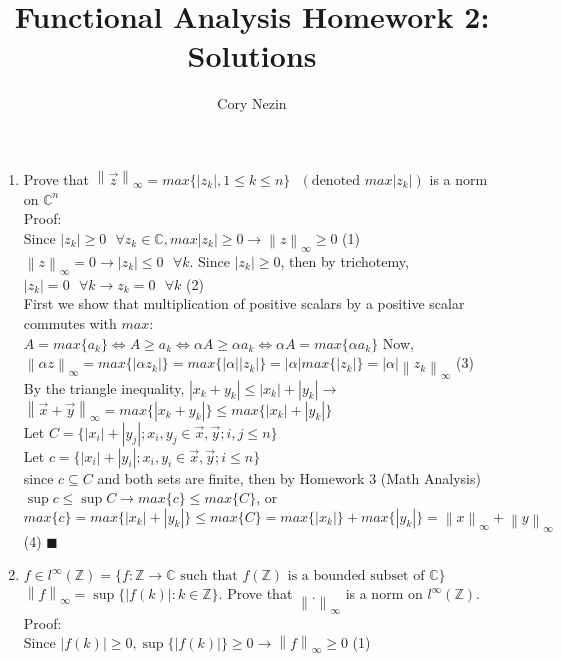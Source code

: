 \documentclass[12pt]{article}
\title{Functional Analysis Homework 2: Solutions}
\author{Cory Nezin}
\newcommand{\norm}[1]{\left \lVert#1\right\rVert_\infty}
\begin{document}
\maketitle
\begin{enumerate}
\item Prove that $\norm{\vec{z}} = max\{|z_k|, 1\leq k\leq n\} \text{ }(\text{denoted } max{|z_k|})$ is a norm on $\mathbb{C}^n$\\
Proof:\\
Since $|z_k| \geq 0 \text{ } \forall z_k \in \mathbb{C}, max{|z_k|} \geq 0 \rightarrow \norm{z} \geq 0$ (1)\\
$\norm{z} = 0 \rightarrow |z_k| \leq 0 \text{ }\forall k$.  Since $|z_k| \geq 0$, then by trichotemy, $|z_k| = 0 \text{ } \forall k \rightarrow z_k = 0 \text{ }\forall k$ (2)\\
First we show that multiplication of positive scalars by a positive scalar commutes with $max$:\\
$A = max\{a_k\} \Leftrightarrow A \geq a_k \Leftrightarrow \alpha A \geq \alpha a_k \Leftrightarrow \alpha A = max\{\alpha a_k\}$ Now,\\
$\norm{\alpha z} = max\{|\alpha z_k|\} = max\{|\alpha| |z_k|\} = |\alpha|max\{|z_k|\} = |\alpha|\norm{z_k}$ (3)\\
By the triangle inequality, $|x_k+y_k| \leq |x_k| + |y_k|\rightarrow$\\
$\norm{\vec{x}+\vec{y}} = max\{|x_k+y_k|\} \leq max\{|x_k|+|y_k|\}$\\
Let $C = \{|x_i| + |y_j|; x_i,y_j \in \vec{x},\vec{y}; i,j \leq n\}$\\
Let $c = \{|x_i| + |y_i|; x_i,y_i \in \vec{x},\vec{y}; i \leq n\}$\\
since $c \subseteq C$ and both sets are finite, then by Homework 3 (Math Analysis) $\sup c \leq \sup C \rightarrow max\{c\} \leq max\{C\}$, or\\
$max\{c\} = max\{|x_k|+|y_k|\} \leq max\{C\} = max\{|x_k|\} + max\{|y_k|\} = \norm{x} + \norm{y}$ (4) $\blacksquare$
\item $f \in l^\infty(\mathbb{Z}) = \{f:\mathbb{Z} \rightarrow \mathbb{C} \text{ such that } f(\mathbb{Z}) \text{ is a bounded subset of } \mathbb{C}\}$\\
$\norm{f} = \sup\{|f(k)|:k\in\mathbb{Z}\}$.  Prove that $\norm{.}$ is a norm on $l^\infty(\mathbb{Z})$.\\
Proof:\\
Since $|f(k)| \geq 0, \sup\{|f(k)|\} \geq 0 \rightarrow \norm{f} \geq 0$ (1)\\

\end{enumerate}
\end{document}
